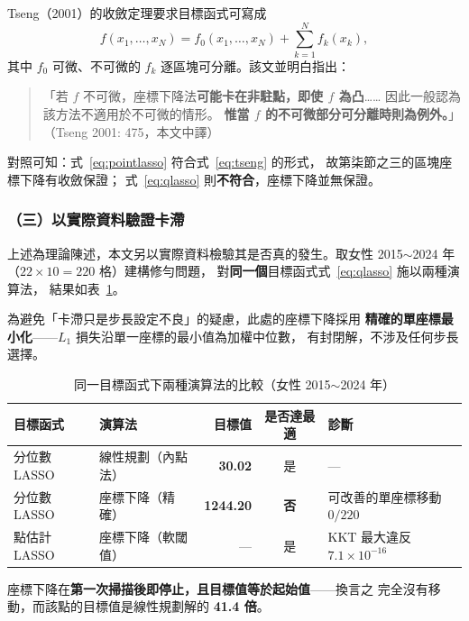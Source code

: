 \documentclass[UTF8, fontset=macnew, a4paper, 12pt]{ctexart}
\begin{document}
Tseng（2001）的收斂定理要求目標函式可寫成
\begin{equation}\label{eq:tseng}
f(x_1,\dots,x_N)=f_0(x_1,\dots,x_N)+\sum_{k=1}^{N} f_k(x_k),
\end{equation}
其中 $f_0$ 可微、不可微的 $f_k$ 逐區塊可分離。該文並明白指出：

\begin{quote}\small
「若 $f$ 不可微，座標下降法\textbf{可能卡在非駐點，即使 $f$ 為凸}……
因此一般認為該方法不適用於不可微的情形。
\textbf{惟當 $f$ 的不可微部分可分離時則為例外。}」
（Tseng 2001: 475，本文中譯）
\end{quote}

對照可知：式~\eqref{eq:pointlasso} 符合式~\eqref{eq:tseng} 的形式，
故第柒節之三的區塊座標下降有收斂保證；
式~\eqref{eq:qlasso} 則\textbf{不符合}，座標下降並無保證。

\subsubsection{（三）以實際資料驗證卡滯}

上述為理論陳述，本文另以實際資料檢驗其是否真的發生。取女性
2015$\sim$2024 年（$22\times10=220$ 格）建構修勻問題，
對\textbf{同一個}目標函式式~\eqref{eq:qlasso} 施以兩種演算法，
結果如表~\ref{tab:algo}。

為避免「卡滯只是步長設定不良」的疑慮，此處的座標下降採用
\textbf{精確的單座標最小化}——$L_1$ 損失沿單一座標的最小值為加權中位數，
有封閉解，不涉及任何步長選擇。

\begin{table}[H]
\centering
\caption{同一目標函式下兩種演算法的比較（女性 2015$\sim$2024 年）}
\small
\begin{tabular}{llrcl}
\toprule
目標函式 & 演算法 & 目標值 & 是否達最適 & 診斷\\
\midrule
分位數 LASSO & 線性規劃（內點法） & \textbf{30.02} & 是 & ---\\
分位數 LASSO & 座標下降（精確） & \textbf{1244.20} & \textbf{否} & 可改善的單座標移動 $0/220$\\
\midrule
點估計 LASSO & 座標下降（軟閾值） & --- & 是 & KKT 最大違反 $7.1\times10^{-16}$\\
\bottomrule
\end{tabular}
\label{tab:algo}
\end{table}

座標下降在\textbf{第一次掃描後即停止，且目標值等於起始值}——換言之
完全沒有移動，而該點的目標值是線性規劃解的 \textbf{41.4 倍}。
\end{document}
